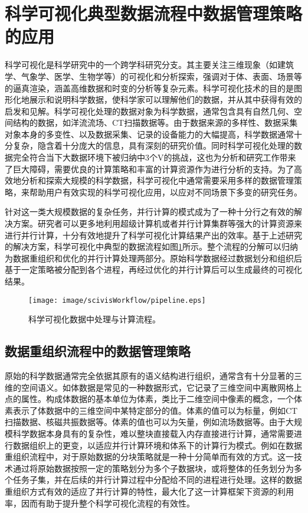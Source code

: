 \section{科学可视化典型数据流程中数据管理策略的应用}

科学可视化是科学研究中的一个跨学科研究分支。其主要关注三维现象（如建筑学、气象学、医学、生物学等）的可视化和分析探索，强调对于体、表面、场景等的逼真渲染，涵盖高维数据和时变的分析等复杂元素。科学可视化技术的目的是图形化地展示和说明科学数据，使科学家可以理解他们的数据，并从其中获得有效的启发和见解。科学可视化处理的数据对象为科学数据，通常包含具有自然几何、空间结构的数据，如洋流流场、CT扫描数据等。由于数据来源的多样性、数据采集对象本身的多变性、以及数据采集、记录的设备能力的大幅提高，科学数据通常十分复杂，隐含着十分庞大的信息，具有深刻的研究价值。同时科学可视化处理的数据完全符合当下大数据环境下被归纳中3个V的挑战，这也为分析和研究工作带来了巨大障碍，需要优良的计算策略和丰富的计算资源作为进行分析的支持。为了高效地分析和探索大规模的科学数据，科学可视化中通常需要采用多样的数据管理策略，来帮助用户有效实现的科学可视化应用，以应对不同场景下多变的研究任务。

针对这一类大规模数据的复杂任务，并行计算的模式成为了一种十分行之有效的解决方案。研究者可以更多地利用超级计算机或者并行计算集群等强大的计算资源来进行并行计算，十分有效地提升了科学可视化计算结果产出的效率。基于上述研究的解决方案，科学可视化中典型的数据流程如图\ref{fig:scivisWorkflow:pipeline}所示。整个流程的分解可以归纳为数据重组织和优化的并行计算处理两部分。原始科学数据经过数据划分和组织后基于一定策略被分配到各个进程，再经过优化的并行计算后可以生成最终的可视化结果。

\begin{figure}[h]
  \centering
  \texttt{[image: image/scivisWorkflow/pipeline.eps]}
  \caption{
    科学可视化数据中处理与计算流程。
  }
  \label{fig:scivisWorkflow:pipeline}
\end{figure}

\subsection{数据重组织流程中的数据管理策略}
原始的科学数据通常完全依据其原有的语义结构进行组织，通常含有十分显著的三维的空间语义。如体数据是常见的一种数据形式，它记录了三维空间中离散网格上点的属性。构成体数据的基本单位为体素，类比于二维空间中像素的概念，一个体素表示了体数据中的三维空间中某特定部分的值。体素的值可以为标量，例如CT扫描数据、核磁共振数据等。体素的值也可以为矢量，例如流场数据等。由于大规模科学数据本身具有的复杂性，难以整块直接载入内存直接进行计算，通常需要进行数据组织上的更变，以适应并行计算环境和体系下的计算行为模式。例如在数据重组织流程中，对于原始数据的分块策略就是一种十分简单而有效的方式。这一技术通过将原始数据按照一定的策略划分为多个子数据块，或将整体的任务划分为多个任务子集，并在后续的并行计算过程中分配给不同的进程进行处理。这样的数据重组织方式有效的适应了并行计算的特性，最大化了这一计算框架下资源的利用率，因而有助于提升整个科学可视化流程的有效性。

